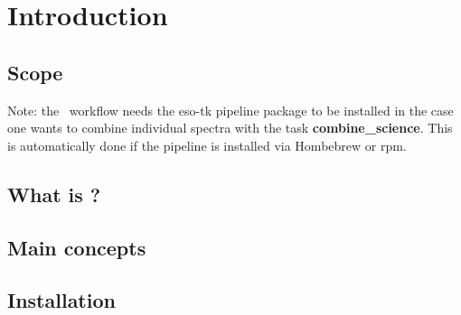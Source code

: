 \section{Introduction}

\subsection{Scope}


Note: the \instname\ workflow needs the eso-tk pipeline package to be installed in the case one wants to combine individual spectra with the task {\bf combine\_science}. This is automatically done if the pipeline is installed via Hombebrew or rpm.

\subsection{What is \edps?}
\label{sec:what_is_edps}


\subsection{Main concepts}
\label{sec:main_concepts}


\subsection{Installation}
\label{sec:installation}

